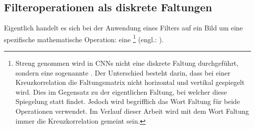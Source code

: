 \subsection{Filteroperationen als diskrete Faltungen}\label{sec:filteroperation_mathematisch}
Eigentlich handelt es sich bei der Anwendung eines Filters auf ein Bild um
eine spezifische mathematische Operation: eine %
\footnote{
  Streng genommen wird in CNNs nicht eine diskrete Faltung durchgeführt, sondern
  eine sogenannte . Der Unterschied besteht darin, dass bei einer
  Kreuzkorrelation die Faltungsmatrix nicht horizontal und vertikal
  gespiegelt wird. Dies im Gegensatz zu der eigentlichen Faltung, bei welcher
  diese Spiegelung statt findet. Jedoch wird
  begrifflich das Wort Faltung für beide Operationen verwendet. Im Verlauf dieser Arbeit
  wird mit dem Wort Faltung immer die Kreuzkorrelation gemeint sein.
} (engl.: ).


